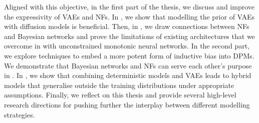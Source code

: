 Aligned with this objective, in the first part of the thesis, we discuss and improve the expressivity of VAEs and NFs. In , we show that modelling the prior of VAEs with diffusion models is beneficial. Then, in , we draw connections between NFs and Bayesian networks and prove the limitations of existing architectures that we overcome in  with unconstrained monotonic neural networks. In the second part, we explore techniques to embed a more potent form of inductive bias into DPMs. We demonstrate that Bayesian networks and NFs can serve each other's purpose in . In , we show that combining deterministic models and VAEs leads to hybrid models that generalise outside the training distributions under appropriate assumptions. Finally, we reflect on this thesis and provide several high-level research directions for pushing further the interplay between different modelling strategies.

%
%
